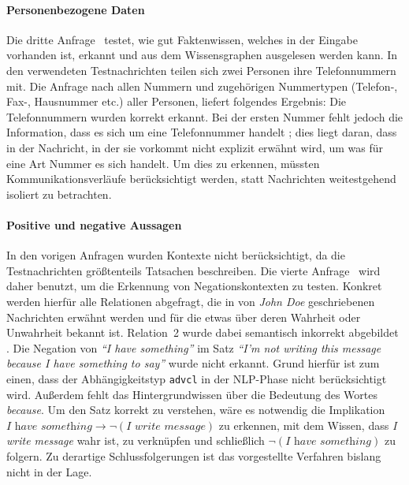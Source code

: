 \paragraph{Personenbezogene Daten}
Die dritte Anfrage~ testet, wie gut Faktenwissen, welches in der Eingabe vorhanden ist, erkannt und aus dem Wissensgraphen ausgelesen werden kann.
In den verwendeten Testnachrichten teilen sich zwei Personen ihre Telefonnummern mit.
Die Anfrage nach allen Nummern und zugehörigen Nummertypen (Telefon-, Fax-, Hausnummer etc.) aller Personen, liefert folgendes Ergebnis:
Die Telefonnummern wurden korrekt erkannt.
Bei der ersten Nummer fehlt jedoch die Information, dass es sich um eine Telefonnummer handelt \errorB;\@
dies liegt daran, dass in der Nachricht, in der sie vorkommt nicht explizit erwähnt wird, um was für eine Art Nummer es sich handelt.
Um dies zu erkennen, müssten Kommunikationsverläufe berücksichtigt werden, statt Nachrichten weitestgehend isoliert zu betrachten.

\paragraph{Positive und negative Aussagen}
In den vorigen Anfragen wurden Kontexte nicht berücksichtigt, da die Testnachrichten größtenteils Tatsachen beschreiben.
Die vierte Anfrage~ wird daher benutzt, um die Erkennung von Negationskontexten zu testen.
Konkret werden hierfür alle Relationen abgefragt, die in von \textit{John Doe} geschriebenen Nachrichten erwähnt werden und für die etwas über deren Wahrheit oder Unwahrheit bekannt ist.
Relation~2 wurde dabei semantisch inkorrekt abgebildet \errorA.
Die Negation von \textit{``I have something''} im Satz \textit{``I'm not writing this message because I have something to say''} wurde nicht erkannt.
Grund hierfür ist zum einen, dass der Abhängigkeitstyp \texttt{advcl} in der NLP-Phase nicht berücksichtigt wird.
Außerdem fehlt das Hintergrundwissen über die Bedeutung des Wortes \textit{because}.
Um den Satz korrekt zu verstehen, wäre es notwendig die Implikation $\textit{I have something} \rightarrow \lnot(\textit{I write message})$ zu erkennen, mit dem Wissen, dass \textit{I write message} wahr ist, zu verknüpfen und schließlich $\lnot(\textit{I have something})$ zu folgern.
Zu derartige Schlussfolgerungen ist das vorgestellte Verfahren bislang nicht in der Lage.

